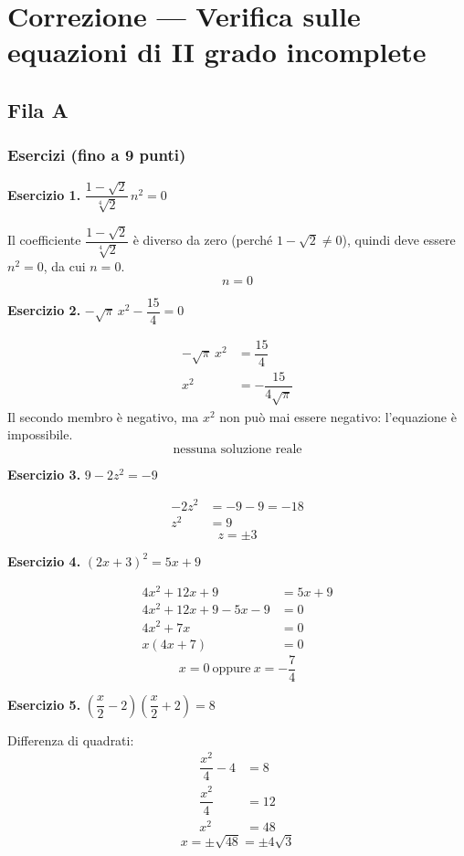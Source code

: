 \documentclass[11pt]{report}
\newcommand{\eserc}[1]{\bigskip\noindent\textbf{Esercizio #1.}\quad}
\begin{document}
\chapter*{Correzione — Verifica sulle equazioni di II grado incomplete}

\section*{Fila A}

\subsection*{Esercizi (fino a 9 punti)}

\eserc{1} $\dfrac{1-\sqrt2}{\sqrt[4]2}\,n^2=0$

Il coefficiente $\dfrac{1-\sqrt2}{\sqrt[4]2}$ è diverso da zero (perché $1-\sqrt2\neq0$), quindi deve essere $n^2=0$, da cui $n=0$.
\[
\boxed{n=0}
\]

\eserc{2} $-\sqrt\pi\,x^2-\dfrac{15}{4}=0$

\begin{align*}
-\sqrt\pi\,x^2 &= \dfrac{15}{4}\\
x^2 &= -\dfrac{15}{4\sqrt\pi}
\end{align*}
Il secondo membro è negativo, ma $x^2$ non può mai essere negativo: l'equazione è impossibile.
\[
\boxed{\text{nessuna soluzione reale}}
\]

\eserc{3} $9-2z^2=-9$

\begin{align*}
-2z^2 &= -9-9=-18\\
z^2 &= 9
\end{align*}
\[
\boxed{z=\pm3}
\]

\eserc{4} $(2x+3)^2=5x+9$

\begin{align*}
4x^2+12x+9 &= 5x+9\\
4x^2+12x+9-5x-9 &=0\\
4x^2+7x &=0\\
x(4x+7)&=0
\end{align*}
\[
\boxed{x=0 \ \text{oppure}\ x=-\dfrac74}
\]

\eserc{5} $\left(\dfrac x2-2\right)\left(\dfrac x2+2\right)=8$

Differenza di quadrati:
\begin{align*}
\dfrac{x^2}{4}-4 &= 8\\
\dfrac{x^2}{4} &= 12\\
x^2 &= 48
\end{align*}
\[
\boxed{x=\pm\sqrt{48}=\pm4\sqrt3}
\]
\end{document}
